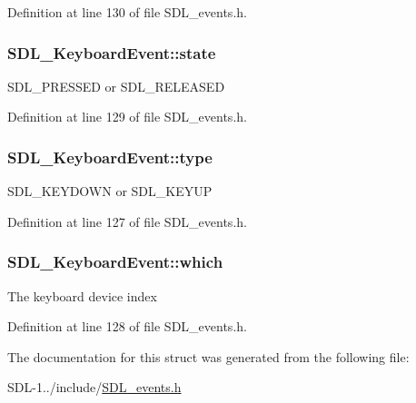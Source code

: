 Definition at line 130 of file S\+D\+L\+\_\+events.\+h.

\hypertarget{struct_s_d_l___keyboard_event_a110558eb96c113c86cfa31a7018c2346}{}
\subsubsection[{state}]{ S\+D\+L\+\_\+\+Keyboard\+Event\+::state}\label{struct_s_d_l___keyboard_event_a110558eb96c113c86cfa31a7018c2346}
S\+D\+L\+\_\+\+P\+R\+E\+S\+S\+E\+D or S\+D\+L\+\_\+\+R\+E\+L\+E\+A\+S\+E\+D 

Definition at line 129 of file S\+D\+L\+\_\+events.\+h.

\hypertarget{struct_s_d_l___keyboard_event_a325194806bc8a4a259fc6c610d487293}{}
\subsubsection[{type}]{ S\+D\+L\+\_\+\+Keyboard\+Event\+::type}\label{struct_s_d_l___keyboard_event_a325194806bc8a4a259fc6c610d487293}
S\+D\+L\+\_\+\+K\+E\+Y\+D\+O\+W\+N or S\+D\+L\+\_\+\+K\+E\+Y\+U\+P 

Definition at line 127 of file S\+D\+L\+\_\+events.\+h.

\hypertarget{struct_s_d_l___keyboard_event_acb25972bab6a9f142de5652530857b9b}{}
\subsubsection[{which}]{ S\+D\+L\+\_\+\+Keyboard\+Event\+::which}\label{struct_s_d_l___keyboard_event_acb25972bab6a9f142de5652530857b9b}
The keyboard device index 

Definition at line 128 of file S\+D\+L\+\_\+events.\+h.



The documentation for this struct was generated from the following file\+:\begin{DoxyCompactItemize}
\item 
S\+D\+L-\/1../include/\hyperlink{_s_d_l__events_8h}{S\+D\+L\+\_\+events.\+h}\end{DoxyCompactItemize}
